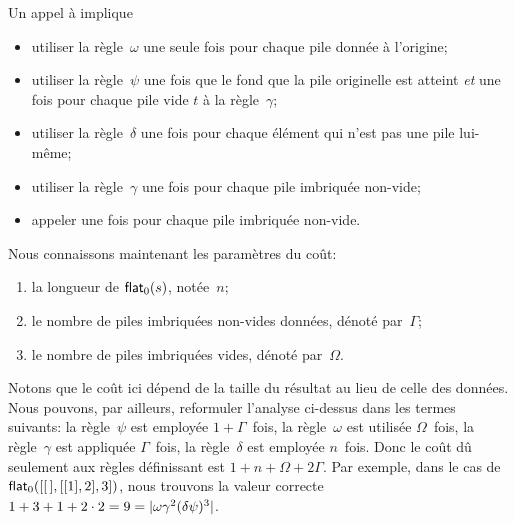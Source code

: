 Un appel à  implique
\begin{itemize}

  \item utiliser la règle~\(\omega\) une seule fois pour chaque pile
    donnée à l'origine;

  \item utiliser la règle~\(\psi\) une fois que le fond que la pile
    originelle est atteint \emph{et} une fois pour chaque pile vide
    \(t\) à la règle~\(\gamma\);

  \item utiliser la règle~\(\delta\) une fois pour chaque élément qui
    n'est pas une pile lui-même;

  \item utiliser la règle~\(\gamma\) une fois pour chaque pile
    imbriquée non-vide;

  \item appeler  une fois pour
    chaque pile imbriquée non-vide.

\end{itemize}
Nous connaissons maintenant les paramètres du coût:
\begin{enumerate}

  \item la longueur de
    \(\textsf{flat}_0(s)\), notée~\(n\);

  \item le nombre de piles imbriquées non-vides données, dénoté
    par~\(\Gamma\);

  \item le nombre de piles imbriquées vides, dénoté par~\(\Omega\).

\end{enumerate}
Notons que le coût ici dépend de la taille du résultat au lieu de
celle des données. Nous pouvons, par ailleurs, reformuler l'analyse
ci-dessus dans les termes suivants: la règle~\(\psi\) est employée \(1
+ \Gamma\)~fois, la règle~\(\omega\) est utilisée \(\Omega\)~fois, la
règle~\(\gamma\) est appliquée \(\Gamma\)~fois, la règle~\(\delta\)
est employée \(n\)~fois. Donc le coût dû seulement aux règles
définissant  est \(1 +
n + \Omega + 2\Gamma\). Par exemple, dans le cas de
\(\textsf{flat}_0([[\,],[[1],2],3])\), nous trouvons la valeur correcte
\(1 + 3 + 1 + 2 \cdot 2 = 9 = \lvert{\omega\gamma^2(\delta\psi)^3}\rvert{}\).


